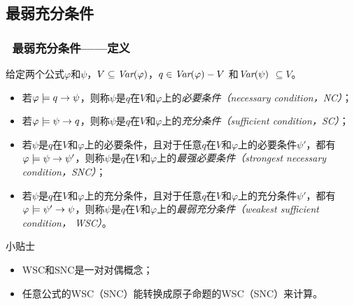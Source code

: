 \documentclass[9pt, CJK]{beamer}
\begin{document}
\subsection{最弱充分条件}
\begin{frame}
	\frametitle{~最弱充分条件——{\footnotesize 定义}}
	{\footnotesize
		\begin{definition}[充分和必要条件]\label{def:NC:SC}
			给定两个公式$\varphi$和$\psi$，$V \subseteq \textit{Var}(\varphi)$，$q\in\textit{Var}(\varphi)- V$
			和$\textit{Var}(\psi)$ $\subseteq V$。
			\begin{itemize}
				\item 若$\varphi \models q \rightarrow \psi$，则称$\psi$是$q$在$V$和$\varphi$上的{\em 必要条件（necessary condition，NC）}；
				\item 若$\varphi \models \psi\rightarrow q$，则称$\psi$是$q$在$V$和$\varphi$上的{\em 充分条件（sufficient condition，SC）}；
				\item 若$\psi$是$q$在$V$和$\varphi$上的必要条件，且对于任意$q$在$V$和$\varphi$上的必要条件$\psi'$，都有$\varphi\models\psi\rightarrow\psi'$，则称$\psi$是$q$在$V$和$\varphi$上的{\em 最强必要条件（strongest necessary condition，SNC）}；
				\item 若$\psi$是$q$在$V$和$\varphi$上的充分条件，且对于任意$q$在$V$和$\varphi$上的充分条件$\psi'$，都有$\varphi\models\psi'\rightarrow\psi$，则称$\psi$是$q$在$V$和$\varphi$上的{\em 最弱充分条件（weakest sufficient condition， WSC）}。
			\end{itemize}
		\end{definition}
	{\tiny \begin{block}{{\scriptsize 小贴士}}
		\begin{itemize}
			\item WSC和SNC是一对对偶概念；
			\item 任意公式的WSC（SNC）能转换成原子命题的WSC（SNC）来计算。
		\end{itemize}
	\end{block}}
	}
\end{frame}
\end{document}
